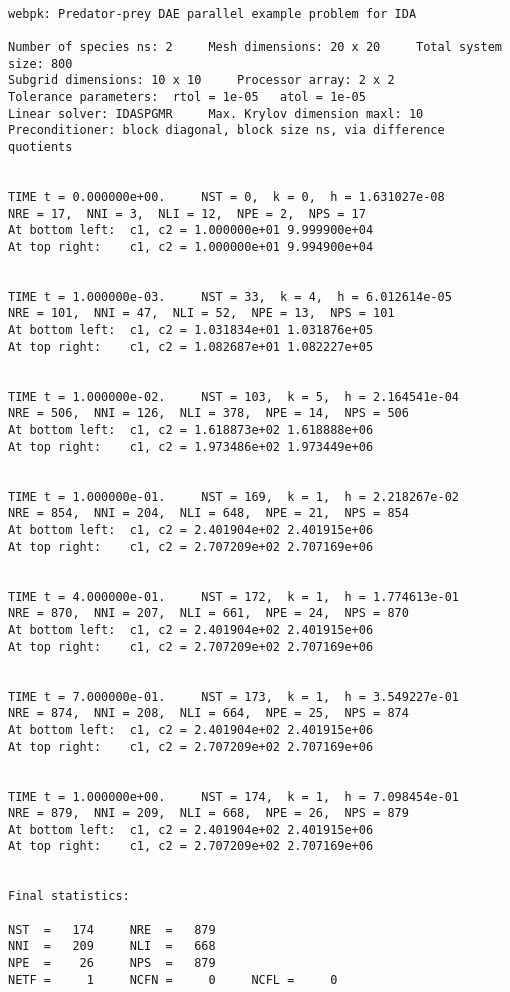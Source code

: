 \documentclass[11pt]{article}
\begin{document}
\small
\begin{verbatim}

webpk: Predator-prey DAE parallel example problem for IDA 

Number of species ns: 2     Mesh dimensions: 20 x 20     Total system size: 800
Subgrid dimensions: 10 x 10     Processor array: 2 x 2
Tolerance parameters:  rtol = 1e-05   atol = 1e-05
Linear solver: IDASPGMR     Max. Krylov dimension maxl: 10
Preconditioner: block diagonal, block size ns, via difference quotients 


TIME t = 0.000000e+00.     NST = 0,  k = 0,  h = 1.631027e-08
NRE = 17,  NNI = 3,  NLI = 12,  NPE = 2,  NPS = 17
At bottom left:  c1, c2 = 1.000000e+01 9.999900e+04 
At top right:    c1, c2 = 1.000000e+01 9.994900e+04 


TIME t = 1.000000e-03.     NST = 33,  k = 4,  h = 6.012614e-05
NRE = 101,  NNI = 47,  NLI = 52,  NPE = 13,  NPS = 101
At bottom left:  c1, c2 = 1.031834e+01 1.031876e+05 
At top right:    c1, c2 = 1.082687e+01 1.082227e+05 


TIME t = 1.000000e-02.     NST = 103,  k = 5,  h = 2.164541e-04
NRE = 506,  NNI = 126,  NLI = 378,  NPE = 14,  NPS = 506
At bottom left:  c1, c2 = 1.618873e+02 1.618888e+06 
At top right:    c1, c2 = 1.973486e+02 1.973449e+06 


TIME t = 1.000000e-01.     NST = 169,  k = 1,  h = 2.218267e-02
NRE = 854,  NNI = 204,  NLI = 648,  NPE = 21,  NPS = 854
At bottom left:  c1, c2 = 2.401904e+02 2.401915e+06 
At top right:    c1, c2 = 2.707209e+02 2.707169e+06 


TIME t = 4.000000e-01.     NST = 172,  k = 1,  h = 1.774613e-01
NRE = 870,  NNI = 207,  NLI = 661,  NPE = 24,  NPS = 870
At bottom left:  c1, c2 = 2.401904e+02 2.401915e+06 
At top right:    c1, c2 = 2.707209e+02 2.707169e+06 


TIME t = 7.000000e-01.     NST = 173,  k = 1,  h = 3.549227e-01
NRE = 874,  NNI = 208,  NLI = 664,  NPE = 25,  NPS = 874
At bottom left:  c1, c2 = 2.401904e+02 2.401915e+06 
At top right:    c1, c2 = 2.707209e+02 2.707169e+06 


TIME t = 1.000000e+00.     NST = 174,  k = 1,  h = 7.098454e-01
NRE = 879,  NNI = 209,  NLI = 668,  NPE = 26,  NPS = 879
At bottom left:  c1, c2 = 2.401904e+02 2.401915e+06 
At top right:    c1, c2 = 2.707209e+02 2.707169e+06 


Final statistics: 

NST  =   174     NRE  =   879
NNI  =   209     NLI  =   668
NPE  =    26     NPS  =   879
NETF =     1     NCFN =     0     NCFL =     0

\end{verbatim}
\end{document}
